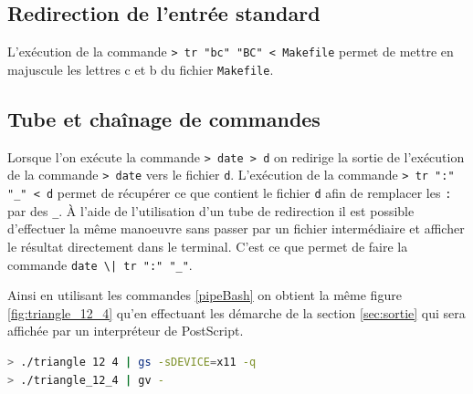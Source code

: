 \subsection{Redirection de l'entrée standard}
L'exécution de la commande \verb|> tr "bc" "BC" < Makefile| permet de mettre en majuscule les lettres c et b du fichier \verb|Makefile|. 

\subsection{Tube et chaînage de commandes}
\label{sec:tube}
Lorsque l'on exécute la commande \verb|> date > d| on redirige la sortie de l'exécution de la commande \verb|> date| vers le fichier \verb|d|.
L'exécution de la commande \verb|> tr ":" "_" < d| permet de récupérer ce que contient le fichier \verb|d| afin de remplacer les \verb|:| par des \verb|_|.
À l'aide de l'utilisation d'un tube de redirection il est possible d'effectuer la même manoeuvre sans passer par un fichier intermédiaire et afficher le résultat directement dans le terminal.
C'est ce que permet de faire la commande \verb!date \| tr ":" "_"!.

Ainsi en utilisant les commandes \ref{pipeBash} on obtient la même figure \ref{fig:triangle_12_4} qu'en effectuant les démarche de la section \ref{sec:sortie} qui sera affichée par un interpréteur de PostScript.

\begin{lstlisting}[language=bash, label=pipeBash, caption=Tubes de redirection]
> ./triangle 12 4 | gs -sDEVICE=x11 -q
> ./triangle_12_4 | gv -
\end{lstlisting}













